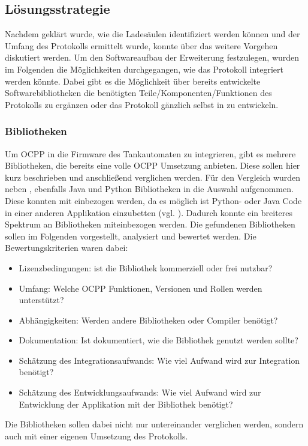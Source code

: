 \subsection{Lösungsstrategie}
Nachdem geklärt wurde, wie die Ladesäulen identifiziert werden können und der Umfang des Protokolls ermittelt wurde, konnte über das weitere Vorgehen diskutiert werden. Um den Softwareaufbau der Erweiterung festzulegen, wurden im Folgenden die Möglichkeiten durchgegangen, wie das Protokoll integriert werden könnte. Dabei gibt es die Möglichkeit über bereits entwickelte Softwarebibliotheken die benötigten Teile/Komponenten/Funktionen des Protokolls zu ergänzen oder das Protokoll gänzlich selbst in \cpp zu entwickeln.
\subsubsection{Bibliotheken}
Um \acs{OCPP} in die Firmware des Tankautomaten zu integrieren, gibt es mehrere Bibliotheken, die bereits eine volle \acs{OCPP} Umsetzung anbieten. Diese sollen hier kurz beschrieben und anschließend verglichen werden. Für den Vergleich wurden neben \cpp, ebenfalls Java und Python Bibliotheken in die Auswahl aufgenommen. Diese konnten mit einbezogen werden, da es möglich ist Python- oder Java Code in einer anderen Applikation einzubetten (vgl. \cite{Python-embedding, Java-embedding}). Dadurch konnte ein breiteres Spektrum an Bibliotheken miteinbezogen werden. Die gefundenen Bibliotheken sollen im Folgenden vorgestellt, analysiert und bewertet werden. Die Bewertungskriterien waren dabei:
\begin{itemize}
	\item Lizenzbedingungen: ist die Bibliothek kommerziell oder frei nutzbar?
	\item Umfang: Welche OCPP Funktionen, Versionen und Rollen werden unterstützt?
	\item Abhängigkeiten: Werden andere Bibliotheken oder Compiler benötigt?
	\item Dokumentation: Ist dokumentiert, wie die Bibliothek genutzt werden sollte?
	\item Schätzung des Integrationsaufwands: Wie viel Aufwand wird zur Integration benötigt?
	\item Schätzung des Entwicklungsaufwands: Wie viel Aufwand wird zur Entwicklung der Applikation mit der Bibliothek benötigt?
\end{itemize}

\noindent Die Bibliotheken sollen dabei nicht nur untereinander verglichen werden, sondern auch mit einer eigenen Umsetzung des Protokolls.

